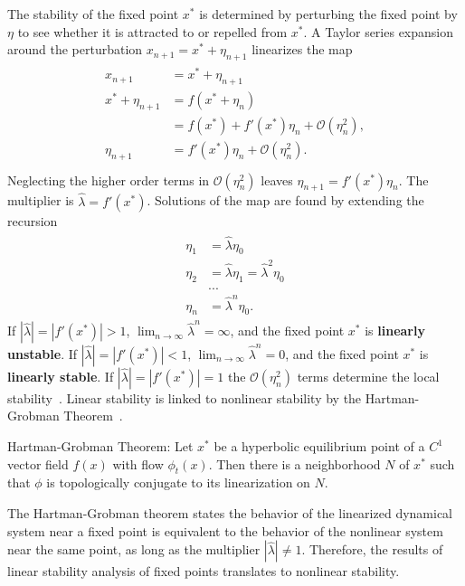 The stability of the fixed point $x^*$ is
determined by perturbing the fixed point by $\eta$ to see whether it is
attracted to or repelled from $x^*$. A Taylor series expansion around
the perturbation $x_{n+1} = x^* + \eta_{n+1}$ linearizes the map
\begin{align*}
\begin{split}
x_{n+1} &= x^* + \eta_{n+1}\\
x^* + \eta_{n+1} &= f(x^* + \eta_n)\\
&= f(x^*) + f'(x^*)\eta_n + \mathcal{O}(\eta_n^2),\\
\eta_{n+1} &= f'(x^*)\eta_n + \mathcal{O}(\eta_n^2).\\
\end{split}
\end{align*}
Neglecting the higher order terms in $\mathcal{O}(\eta_n^2)$ leaves
$\eta_{n+1} = f'(x^*)\eta_n$. The multiplier is $\hat{\lambda} =
f'(x^*)$. Solutions of the map are found by extending the recursion
\begin{align*}
\begin{split}
\eta_{1} &= \hat{\lambda}\eta_0\\
\eta_{2} &= \hat{\lambda}\eta_1 = \hat{\lambda}^2\eta_0\\
&...\\
\eta_{n} &=\hat{\lambda}^n\eta_0.
\end{split}
\end{align*}
If $|\hat{\lambda}| = |f'(x^*)| > 1$, $\lim_{n \to \infty}\hat{\lambda}^n = \infty$, and
the fixed point $x^*$ is \textbf{linearly unstable}. If $|\hat{\lambda}| = |f'(x^*)| < 1$, $\lim_{n \to
  \infty}\hat{\lambda}^n = 0$, and the fixed point $x^*$ is
\textbf{linearly stable}. If
$|\hat{\lambda}| = |f'(x^*)| = 1$ the $\mathcal{O}(\eta_n^2)$ terms
determine the local stability~\cite{strogatz}. Linear stability is
linked to nonlinear stability by the Hartman-Grobman Theorem~\cite{meiss}.
\begin{singlespace}
\begin{theorem}
Hartman-Grobman Theorem: Let $x^*$ be a hyperbolic equilibrium point of a $C^1$
vector field $f(x)$ with flow $\phi_t(x)$. Then there is a
neighborhood $N$ of $x^*$ such that $\phi$ is topologically conjugate to its linearization on $N$.
\end{theorem}
\end{singlespace}
The Hartman-Grobman theorem states the behavior of the linearized
dynamical system near a fixed point is equivalent to the
behavior of the nonlinear system near the same point, as long as the
multiplier $|\hat{\lambda}|\neq 1$. Therefore, the results of linear stability
analysis of fixed points translates to nonlinear stability. 

